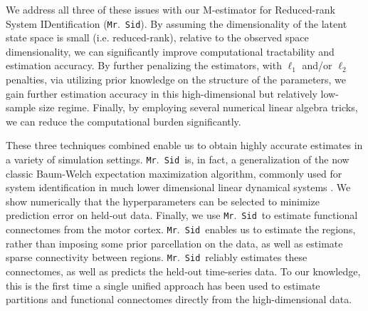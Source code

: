 \documentclass[fleqn,12pt]{article}
\newcommand{\mrsid}{{\sc \texttt{Mr}.~\texttt{Sid}}}
\begin{document}
We address all three of these issues with our M-estimator for Reduced-rank  System IDentification (\mrsid).  By assuming the dimensionality of the latent state space is small (i.e. reduced-rank), relative to the observed space dimensionality, we can significantly improve computational tractability and estimation accuracy. By further penalizing the estimators, with $\ell_1$ and/or $\ell_2$ penalties, via utilizing prior knowledge on the structure of the parameters, we gain further estimation accuracy in this high-dimensional but relatively low-sample size regime.  Finally, by employing several numerical linear algebra tricks, we can reduce the computational burden significantly.
%
%
%
%
%
%
%
%
%

These three techniques combined enable us to obtain highly accurate estimates in a variety of simulation settings.  \mrsid~is, in fact, a generalization of the now classic Baum-Welch expectation maximization algorithm, commonly used for system identification in much lower dimensional linear dynamical systems \citep{rabiner1989tutorial}. We show numerically that the hyperparameters can be selected to minimize prediction error on held-out data.  Finally, we use \mrsid~to estimate functional connectomes from the motor cortex.  \mrsid~enables us to estimate the regions, rather than imposing some prior parcellation on the data, as well as estimate sparse connectivity between regions.  \mrsid~reliably estimates these connectomes, as well as predicts the held-out time-series data.  To our knowledge, this is the first time a single unified approach has been used to estimate partitions and functional connectomes directly from the high-dimensional data.
%
%
%
\end{document}

